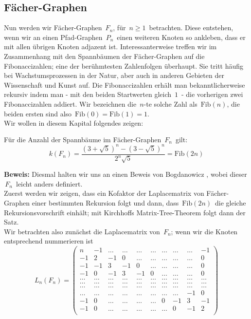 \subsection{Fächer-Graphen}
Nun werden wir Fächer-Graphen $\,F_n$,\; für $\,n \geq 1\,$ betrachten. Diese entstehen, wenn wir an einen Pfad-Graphen $\,P_{n}\,$ einen weiteren Knoten so ankleben, dass er mit allen übrigen Knoten adjazent ist. Interessanterweise treffen wir im Zusammenhang mit den Spannbäumen der Fächer-Graphen auf die  Fibonaccizahlen; eine der berühmtesten Zahlenfolgen überhaupt. Sie tritt häufig bei Wachstumsprozessen in der Natur, aber auch in anderen Gebieten der Wissenschaft und Kunst auf. Die Fibonaccizahlen erhält man bekanntlicherweise rekursiv indem man - mit den  beiden Startwerten gleich $\,1\,$ - die vorherigen zwei Fibonaccizahlen addiert. Wir bezeichnen die $\,n$-te solche Zahl als $\,\mathrm{Fib}(n)$,\; die beiden ersten sind also $\,\mathrm{Fib}(0)=\mathrm{Fib}(1)=1$.\;\\
Wir wollen in diesem Kapital folgendes zeigen:
\begin{Tms}
 Für die Anzahl der Spannbäume im Fächer-Graphen $\,F_n\,$ gilt:
 \begin{equation}
  \mathit{k}(F_n)=\frac{(3+\sqrt{5})^{n}-(3-\sqrt{5})^{n}}{2^{n}\sqrt{5}}=\mathrm{Fib}(2n)
 \end{equation}
 \label{ThmFn}
\end{Tms}
\textbf{Beweis:}
Diesmal halten wir uns an einen Beweis von Bogdanowicz \cite{bogdanowicz_2008}, wobei dieser $\,F_n\,$ leicht anders definiert.\\
Zuerst werden wir zeigen, dass ein Kofaktor der Laplacematrix von Fächer-Graphen einer bestimmten Rekursion folgt und dann, dass $\,\mathrm{Fib}(2n)\,$ die gleiche Rekursionsvorschrift einhält; mit Kirchhoffs Matrix-Tree-Theorem folgt dann der Satz.\\
Wir betrachten also zunächst die Laplacematrix von $\,F_n$; wenn wir die Knoten entsprechend nummerieren ist\\
\begin{equation}
L_n(F_n)=
\begin{pmatrix}
n&-1&\ldots&\ldots&\ldots&\ldots&\ldots&\ldots&\ldots&-1\\
-1&2&-1&0&\ldots&\ldots&\ldots&\ldots&\ldots&0\\
-1&-1&3&-1&0&\ldots&\ldots&\ldots&\ldots&0\\
-1&0&-1&3&-1&0&\ldots&\ldots&\ldots&0\\
\ldots&\ldots&\ldots&\ldots&\ldots&\ldots&\ldots&\ldots&\ldots&\ldots\\
\ldots&\ldots&\ldots&\ldots&\ldots&\ldots&\ldots&\ldots&\ldots&\ldots\\
\ldots&\ldots&\ldots&\ldots&\ldots&\ldots&\ldots&\ldots&\ldots&\ldots\\
\ldots&\ldots&\ldots&\ldots&\ldots&\ldots&\ldots&\ldots&-1&0\\
-1&0&\ldots&\ldots&\ldots&\ldots&0&-1&3&-1\\
-1&0&\ldots&\ldots&\ldots&\ldots&\ldots&0&-1&2\\
\end{pmatrix}
\end{equation}
